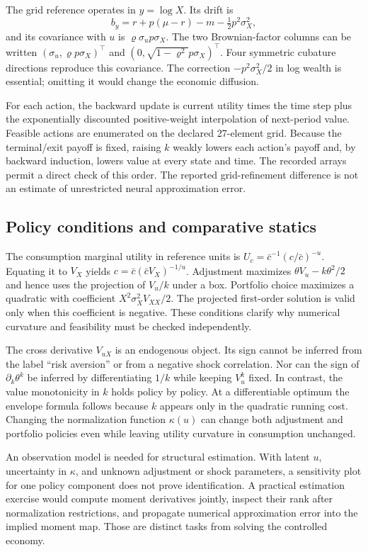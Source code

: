 \documentclass[ecta,draft]{econsocart}
\theoremstyle{definition}
\theoremstyle{remark}
\begin{document}
The grid reference operates in $y=\log X$. Its drift is
\[
 b_y=r+p(\mu-r)-m-\tfrac12p^2\sigma_X^2,
\]
and its covariance with $u$ is $\varrho\sigma_u p\sigma_X$. The two Brownian-factor columns can be written $(\sigma_u,\varrho p\sigma_X)^\top$ and $(0,\sqrt{1-\varrho^2}p\sigma_X)^\top$. Four symmetric cubature directions reproduce this covariance. The correction $-p^2\sigma_X^2/2$ in log wealth is essential; omitting it would change the economic diffusion.

For each action, the backward update is current utility times the time step plus the exponentially discounted positive-weight interpolation of next-period value. Feasible actions are enumerated on the declared 27-element grid. Because the terminal/exit payoff is fixed, raising $k$ weakly lowers each action's payoff and, by backward induction, lowers value at every state and time. The recorded arrays permit a direct check of this order. The reported grid-refinement difference is not an estimate of unrestricted neural approximation error.

\subsection{Policy conditions and comparative statics}
The consumption marginal utility in reference units is $U_c=\bar c^{-1}(c/\bar c)^{-u}$. Equating it to $V_X$ yields $c=\bar c(\bar cV_X)^{-1/u}$. Adjustment maximizes $\theta V_u-k\theta^2/2$ and hence uses the projection of $V_u/k$ under a box. Portfolio choice maximizes a quadratic with coefficient $X^2\sigma_X^2V_{XX}/2$. The projected first-order solution is valid only when this coefficient is negative. These conditions clarify why numerical curvature and feasibility must be checked independently.

The cross derivative $V_{uX}$ is an endogenous object. Its sign cannot be inferred from the label ``risk aversion'' or from a negative shock correlation. Nor can the sign of $\partial_k\theta^k$ be inferred by differentiating $1/k$ while keeping $V_u^k$ fixed. In contrast, the value monotonicity in $k$ holds policy by policy. At a differentiable optimum the envelope formula follows because $k$ appears only in the quadratic running cost. Changing the normalization function $\kappa(u)$ can change both adjustment and portfolio policies even while leaving utility curvature in consumption unchanged.

An observation model is needed for structural estimation. With latent $u$, uncertainty in $\kappa$, and unknown adjustment or shock parameters, a sensitivity plot for one policy component does not prove identification. A practical estimation exercise would compute moment derivatives jointly, inspect their rank after normalization restrictions, and propagate numerical approximation error into the implied moment map. Those are distinct tasks from solving the controlled economy.
\end{document}
